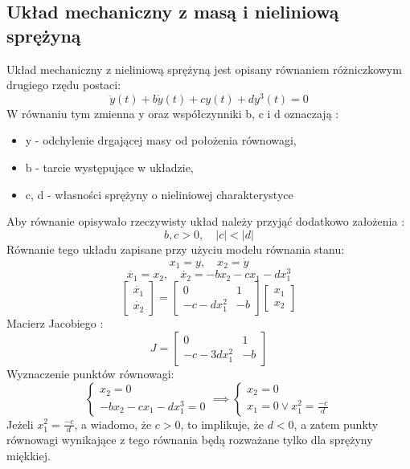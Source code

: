 \documentclass[a4paper,11pt]{article}
\begin{document}
\subsection{Układ mechaniczny z masą i nieliniową sprężyną}
Układ mechaniczny z nieliniową sprężyną jest opisany równaniem różniczkowym drugiego rzędu postaci: 
\begin{equation*}
\ddot{y}(t)+b\dot{y}(t)+cy(t)+dy^{3}(t)=0
\end{equation*}
W równaniu tym zmienna y oraz współczynniki b, c i d oznaczają :
\begin{itemize}
\item y - odchylenie drgającej masy od położenia równowagi, 
\item b - tarcie występujące w układzie,
\item c, d - własności sprężyny o nieliniowej charakterystyce
\end{itemize} 
Aby równanie opisywało rzeczywisty układ należy przyjąć dodatkowo założenia : \\ 
\begin{equation*}
b, c > 0,\quad |{c}|<|{d}|
\end{equation*}
Równanie tego układu zapisane przy użyciu modelu równania stanu: \\
\begin{equation*}
x_{1}=y, \quad x_{2}=\dot{y}
\end{equation*}
\begin{equation*}
\dot{x_{1}}=x_{2}, \quad \dot{x_{2}}=-bx_{2}-cx_{1}-dx_{1}^{3}
\end{equation*}
\begin{equation*}
\begin{bmatrix}
\dot{x_{1}} \\
\dot{x_{2}}
\end{bmatrix} =
\begin{bmatrix}
0 & 1 \\
-c-dx_{1}^{2} & -b 
\end{bmatrix}
\begin{bmatrix}
x_{1} \\
x_{2}
\end{bmatrix}
\end{equation*}
Macierz Jacobiego : 
\begin{equation*}
J=\begin{bmatrix}
0 & 1 \\
-c-3dx_{1}^{2} & -b 
\end{bmatrix}
\end{equation*}
Wyznaczenie punktów równowagi: \\
\begin{equation*}
\begin{cases}
x_{2}=0 \\
-bx_{2}-cx_{1}-dx_{1}^{3}=0
\end{cases} \implies
\begin{cases}
x_{2}=0 \\
x_{1}=0 \lor x_{1}^{2}=\frac{-c}{d}
\end{cases}
\end{equation*}
Jeżeli \(x_{1}^{2}=\frac{-c}{d}\), a wiadomo, że \(c>0\), to implikuje, że \(d<0\), a zatem punkty równowagi wynikające z tego równania będą rozważane tylko dla sprężyny miękkiej.
\end{document}
